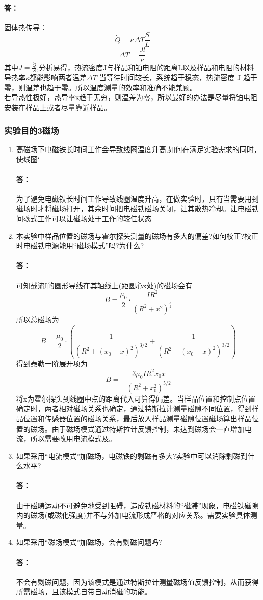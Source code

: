 \documentclass{ctexart}
\theoremstyle{ansstyle}
\begin{document}
\begin{enumerate}
		\paragraph{答：}固体热传导：
		$$\dot{Q}=\kappa \Delta T\frac{S}{L}$$
		$$\Delta T=\frac{Jl}{\kappa}$$
		其中$J=\frac{\dot{Q}}{S}$,分析易得，热流密度J与样品和铂电阻的距离L以及样品和电阻的材料导热率$\kappa$都能影响两者温差$\Delta T$
		当等待时间较长，系统趋于稳态，热流密度 J 趋于零，则温差也趋于零。所以温度测量的效率和准确不能兼顾。\\
		若导热性极好，热导率κ趋于无穷，则温差为零，所以最好的办法是尽量将铂电阻安装在样品上或者尽量靠近样品。
	\end{enumerate}
	\subsubsection{实验目的3磁场}
	\begin{enumerate}
		
		\item 高磁场下电磁铁长时间工作会导致线圈温度升高,如何在满足实验需求的同时，使线圈`
		\paragraph{答：}为了避免电磁铁长时间工作导致线圈温度升高，在做实验时，只有当需要用到磁场时才将磁场打开，其余时间把电磁铁磁场关闭，让其散热冷却。让电磁铁间歇式工作可以让磁场处于工作的较佳状态
		\item 本实验中样品位置的磁场与霍尔探头测量的磁场有多大的偏差?如何校正?校正时电磁铁电源能用“磁场模式”吗?为什么?
		\paragraph{答：}可知载流I的圆形导线在其轴线上(距圆心x处)的磁场会有
		$$B=\frac{\mu_{0}}{2}\cdot \frac{IR^{2}}{(R^{2}+x^{2})^{\frac{3}{2}}}$$
		所以总磁场为
		$$B=\frac{\mu_{0}}{2}\cdot (\frac{1}{(R^{2}+(x_{0}-x)^{2})^{3/2}}+\frac{1}{(R^{2}+(x_{0}+x)^{2})^{3/2}})$$
		得到泰勒一阶展开项为$$B=-\frac{3\mu_{0}IR^{2}x_{0}x}{(R^{2}+x_{0}^{2})^{5/2}}$$
		将x为霍尔探头到线圈中点的距离代入可算得偏差。当样品位置和控制点位置确定时，两者相对磁场关系也确定，通过特斯拉计测量磁隙不同位置，得到样品位置和传感器位置的磁场关系，最后放入样品测量磁隙位置磁场算出样品位置的磁场。由于磁场模式通过特斯拉计反馈控制，未达到磁场会一直增加电流，所以需要改用电流模式及。
		\item 如果采用“电流模式”加磁场，电磁铁的剩磁有多大?实验中可以消除剩磁到什么水平?
		\paragraph{答：}由于磁畴运动不可避免地受到阻碍，造成铁磁材料的“磁滞”现象，电磁铁磁隙内的磁场(或磁化强度)并不与外加电流形成严格的对应关系。需要实验具体测量。
		\item 如果采用“磁场模式”加磁场，会有剩磁问题吗?
		\paragraph{答：}不会有剩磁问题，因为该模式是通过特斯拉计测量磁场值反馈控制，从而获得所需磁场，且该模式自带自动消磁的功能。
		
		
	\end{enumerate}
\end{document}
